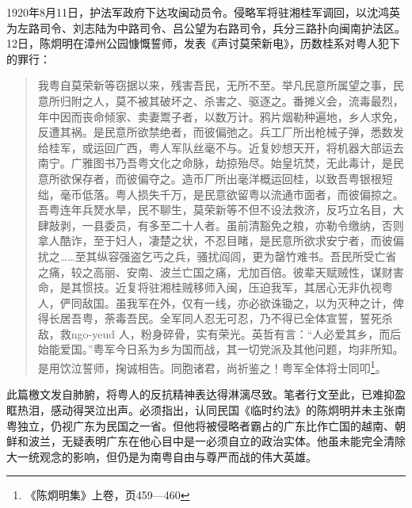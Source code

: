 1920年8月11日，护法军政府下达攻闽动员令。侵略军将驻湘桂军调回，以沈鸿英为左路司令、刘志陆为中路司令、吕公望为右路司令，兵分三路扑向闽南护法区。12日，陈炯明在漳州公园慷慨誓师，发表《声讨莫荣新电》，历数桂系对粤人犯下的罪行：

\begin{quote}
我粤自莫荣新等窃据以来，残害吾民，无所不至。举凡民意所属望之事，民意所归附之人，莫不被其破坏之、杀害之、驱逐之。番摊义会，流毒最烈，年中因而丧命倾家、卖妻鬻子者，以数万计。鸦片烟勒种遍地，乡人求免，反遭其祸。是民意所欲禁绝者，而彼偏弛之。兵工厂所出枪械子弹，悉数发给桂军，或运回广西，粤人军队丝毫不与。近复妙想天开，将机器大部运去南宁。广雅图书乃吾粤文化之命脉，劫掠殆尽。始皇坑焚，无此毒计，是民意所欲保存者，而彼偏夺之。造币厂所出毫洋概运回桂，以致吾粤银根短绌，毫币低落。粤人损失千万，是民意欲留粤以流通市面者，而彼偏掠之。吾粤连年兵燹水旱，民不聊生，莫荣新等不但不设法救济，反巧立名目，大肆敲剥，一县委员，有多至二十人者。虽前清豁免之粮，亦勒令缴纳，否则拿人酷诈，至于妇人，凄楚之状，不忍目睹，是民意所欲求安宁者，而彼偏扰之……至其纵容强盗乞丐之兵，骚扰阎闾，更为罄竹难书。吾民所受亡省之痛，较之高丽、安南、波兰亡国之痛，尤加百倍。彼辈天赋贼性，谋财害命，是其惯技。近复将驻湘桂贼移师入闽，压迫我军，其居心无非仇视粤人，俨同敌国。虽我军在外，仅有一线，亦必欲诛锄之，以为灭种之计，俾得长居吾粤，荼毒吾民。全军同人忍无可忍，乃不得已全体宣誓，誓死杀敌，救ngo-yeud 人，粉身碎骨，实有荣光。英哲有言：“人必爱其乡，而后始能爱国。”粤军今日系为乡为国而战，其一切党派及其他问题，均非所知。是用饮泣誓师，掬诚相告。同胞诸君，尚祈鉴之！粤军全体将士同叩\footnote{《陈炯明集》上卷，页459—460}。
\end{quote}

此篇檄文发自肺腑，将粤人的反抗精神表达得淋漓尽致。笔者行文至此，已难抑盈眶热泪，感动得哭泣出声。必须指出，认同民国《临时约法》的陈炯明并未主张南粤独立，仍视广东为民国之一省。但他将被侵略者霸占的广东比作亡国的越南、朝鲜和波兰，无疑表明广东在他心目中是一必须自立的政治实体。他虽未能完全清除大一统观念的影响，但仍是为南粤自由与尊严而战的伟大英雄。


